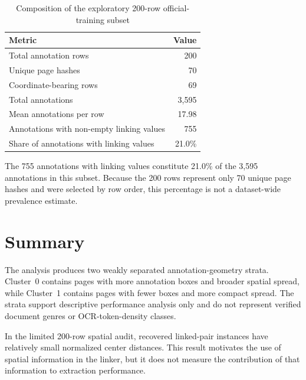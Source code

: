 \begin{table}[h]
\centering
\caption{Composition of the exploratory 200-row official-training subset}
\label{tab:ann_stats}
\begin{tabular}{@{}lr@{}}
\toprule
\textbf{Metric} & \textbf{Value} \\ \midrule
Total annotation rows & 200 \\
Unique page hashes & 70 \\
Coordinate-bearing rows & 69 \\
Total annotations & 3{,}595 \\
Mean annotations per row & 17.98 \\
Annotations with non-empty linking values & 755 \\
Share of annotations with linking values & 21.0\% \\ \bottomrule
\end{tabular}
\end{table}

The 755 annotations with linking values constitute 21.0\% of the 3{,}595
annotations in this subset. Because the 200 rows represent only 70 unique
page hashes and were selected by row order, this percentage is not a
dataset-wide prevalence estimate.

\section{Summary}
\label{sec:dataset_summary}

The analysis produces two weakly separated annotation-geometry strata.
Cluster~0 contains pages with more annotation boxes and broader spatial
spread, while Cluster~1 contains pages with fewer boxes and more compact
spread. The strata support descriptive performance analysis only and do not
represent verified document genres or OCR-token-density classes.

In the limited 200-row spatial audit, recovered linked-pair instances have
relatively small normalized center distances. This result motivates the use
of spatial information in the linker, but it does not measure the contribution
of that information to extraction performance.
